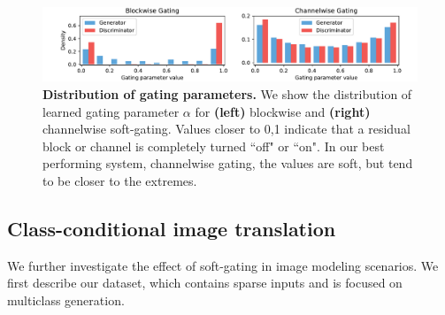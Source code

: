 \begin{figure}[t]%
    \centering
    \includegraphics[width=\linewidth,trim={.7cm 0 .8cm 0},clip]{paper_images/alpha_hist.pdf}\caption{ {\bf Distribution of gating parameters.} We show the distribution of learned gating parameter $\alpha$ for {\bf (left)} blockwise and {\bf (right)} channelwise soft-gating. Values closer to 0,1 indicate that a residual block or channel is completely turned ``off" or ``on". In our best performing system, channelwise gating, the values are soft, but tend to be closer to the extremes.}
    \label{fig:alpha_dist}
    \vspace{-3mm}
\end{figure}


\subsection{Class-conditional image translation}

\noindent We further investigate the effect of soft-gating in image modeling scenarios. We first describe our dataset, which contains sparse inputs and is focused on multiclass generation. 

